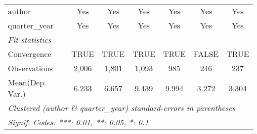 \begin{tabular}{lcccccc}
   author                                & Yes           & Yes           & Yes           & Yes           & Yes        & Yes\\  
   quarter\_year                         & Yes           & Yes           & Yes           & Yes           & Yes        & Yes\\  
   \midrule
   \emph{Fit statistics}\\
   Convergence                           &TRUE           & TRUE          & TRUE          & TRUE          & FALSE      & TRUE\\  
   Observations                          & 2,006         & 1,801         & 1,093         & 985           & 246        & 237\\  
Mean(Dep. Var.) & 6.233 & 6.657 & 9.439 & 9.994 & 3.272 & 3.304 \\
   \midrule \midrule
   \multicolumn{7}{l}{\emph{Clustered (author \& quarter\_year) standard-errors in parentheses}}\\
   \multicolumn{7}{l}{\emph{Signif. Codes: ***: 0.01, **: 0.05, *: 0.1}}\\
\end{tabular}
\par\endgroup
